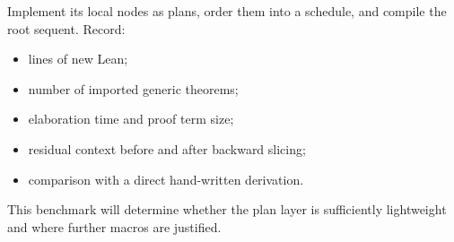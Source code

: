 Implement its local nodes as plans, order them into a schedule, and compile the root sequent.  Record:

\begin{itemize}
\item lines of new Lean;
\item number of imported generic theorems;
\item elaboration time and proof term size;
\item residual context before and after backward slicing;
\item comparison with a direct hand-written derivation.
\end{itemize}

This benchmark will determine whether the plan layer is sufficiently lightweight and where further
macros are justified.
